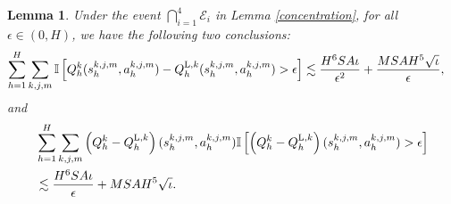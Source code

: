\documentclass{article}
\newtheorem{lemma}{Lemma}[section]
\newcommand{\LL}{\textnormal{L}}
\begin{document}
\begin{lemma}
\label{clipq}
Under the event $\bigcap_{i=1}^{4}\mathcal{E}_i$ in Lemma \ref{concentration}, for all $\epsilon \in (0, H)$, we have the following two conclusions:
\begin{align*} 
    \sum_{h=1}^H \sum_{k,j,m} \mathbb{I} \left [Q_h^k(s_h^{k,j,m}, a_h^{k,j,m}) - Q_h^{\LL, k}(s_h^{k,j,m}, a_h^{k,j,m}) > \epsilon \right]
    &\lesssim \frac{H^6 S A \iota}{\epsilon^2}  + \frac{MSAH^5\sqrt{\iota}}{\epsilon},
\end{align*}
and
\begin{align*} 
     &\sum_{h=1}^H \sum_{k,j,m} \left(Q_h^k - Q_h^{\LL, k}\right)(s_h^{k,j,m}, a_h^{k,j,m}) \mathbb{I}\left[ \left(Q_h^k - Q_h^{\LL, k}\right)(s_h^{k,j,m}, a_h^{k,j,m}) > \epsilon \right] \\
     &\lesssim \frac{H^6 S A \iota}{\epsilon}  + MSAH^5\sqrt{\iota}.
\end{align*}
\end{lemma}
\end{document}
